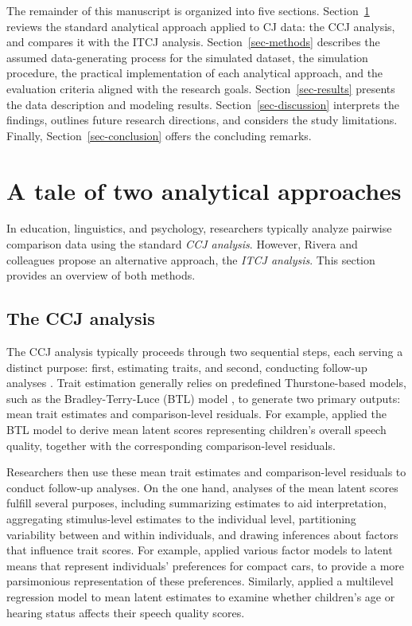 \documentclass[
  authoryear,
  review,
  1p]{elsarticle}
\begin{document}
The remainder of this manuscript is organized into five sections.
Section~\ref{sec-theory} reviews the standard analytical approach
applied to CJ data: the CCJ analysis, and compares it with the ITCJ
analysis. Section~\ref{sec-methods} describes the assumed
data-generating process for the simulated dataset, the simulation
procedure, the practical implementation of each analytical approach, and
the evaluation criteria aligned with the research goals.
Section~\ref{sec-results} presents the data description and modeling
results. Section~\ref{sec-discussion} interprets the findings, outlines
future research directions, and considers the study limitations.
Finally, Section~\ref{sec-conclusion} offers the concluding remarks.

\section{A tale of two analytical approaches}\label{sec-theory}

In education, linguistics, and psychology, researchers typically analyze
pairwise comparison data using the standard \emph{CCJ analysis}.
However, Rivera and colleagues \citeyearpar{Rivera_et_al_2025} propose
an alternative approach, the \emph{ITCJ analysis}. This section provides
an overview of both methods.

\subsection{The CCJ analysis}\label{sec-theory_CCJ}

The CCJ analysis typically proceeds through two sequential steps, each
serving a distinct purpose: first, estimating traits, and second,
conducting follow-up analyses
\citep{Pollitt_2012a, Pollitt_2012b, Jones_et_al_2019, Boonen_et_al_2020, Chambers_et_al_2022, Bouwer_et_al_2023}.
Trait estimation generally relies on predefined Thurstone-based models,
such as the Bradley-Terry-Luce (BTL) model
\citep{Bradley_et_al_1952, Luce_1959}, to generate two primary outputs:
mean trait estimates and comparison-level residuals. For example,
\citet{Boonen_et_al_2020} applied the BTL model to derive mean latent
scores representing children's overall speech quality, together with the
corresponding comparison-level residuals.

Researchers then use these mean trait estimates and comparison-level
residuals to conduct follow-up analyses. On the one hand, analyses of
the mean latent scores fulfill several purposes, including summarizing
estimates to aid interpretation, aggregating stimulus-level estimates to
the individual level, partitioning variability between and within
individuals, and drawing inferences about factors that influence trait
scores. For example, \citet{Maydeu-Olivares_et_al_2005} applied various
factor models to latent means that represent individuals' preferences
for compact cars, to provide a more parsimonious representation of these
preferences. Similarly, \citet{Boonen_et_al_2020} applied a multilevel
regression model to mean latent estimates to examine whether children's
age or hearing status affects their speech quality scores.
\end{document}
